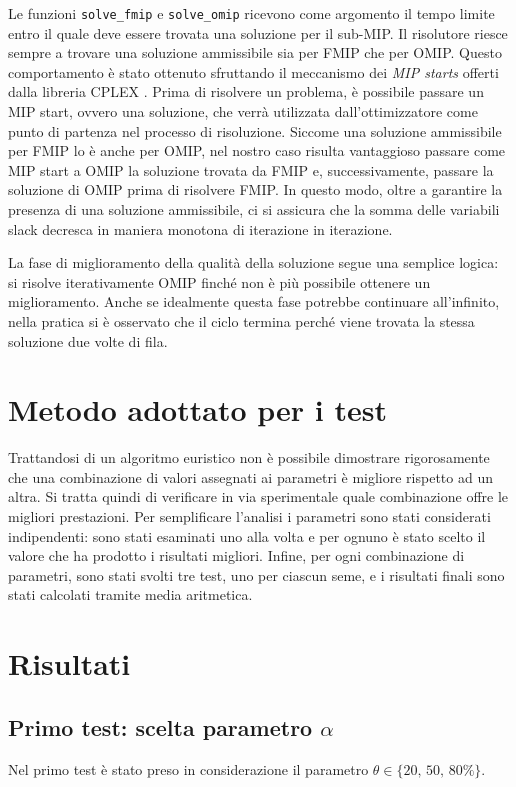 Le funzioni \verb|solve_fmip| e \verb|solve_omip| ricevono come argomento
il tempo limite entro il quale deve essere trovata una soluzione per il sub-MIP.
Il risolutore riesce sempre a trovare una soluzione ammissibile sia per FMIP
che per OMIP.
Questo comportamento è stato ottenuto sfruttando il meccanismo dei
\emph{MIP starts} offerti dalla libreria CPLEX \cite{cplexMipStarts}.
Prima di risolvere un problema, è possibile passare un MIP start, ovvero una 
soluzione, che verrà utilizzata dall'ottimizzatore come punto di partenza
nel processo di risoluzione.
Siccome una soluzione ammissibile per FMIP lo è anche per OMIP, nel
nostro caso risulta vantaggioso passare come MIP start a OMIP la soluzione
trovata da FMIP e, successivamente, passare la soluzione di OMIP
prima di risolvere FMIP.
In questo modo, oltre a garantire la presenza di una soluzione ammissibile,
ci si assicura che la somma delle variabili slack decresca in maniera 
monotona di iterazione in iterazione.

La fase di miglioramento della qualità della soluzione segue una
semplice logica: si risolve iterativamente OMIP finché non è più
possibile ottenere un miglioramento.
Anche se idealmente questa fase potrebbe continuare all'infinito, nella pratica
si è osservato che il ciclo termina perché viene trovata la stessa soluzione
due volte di fila.

\section{Metodo adottato per i test}%
\label{sub:Metodo seguito}
Trattandosi di un algoritmo euristico non è possibile dimostrare rigorosamente
che una combinazione di valori assegnati ai parametri è migliore rispetto ad
un altra.
Si tratta quindi di verificare in via sperimentale quale combinazione
offre le migliori prestazioni.
Per semplificare l'analisi i parametri sono stati considerati indipendenti:
sono stati esaminati uno alla volta e per ognuno è stato
scelto il valore che ha prodotto i risultati migliori.
Infine, per ogni combinazione di parametri, sono stati svolti tre test,
uno per ciascun seme, e i risultati finali sono stati calcolati tramite media
aritmetica.

\section{Risultati}%
\label{sub:I risultati}

\subsection{Primo test: scelta parametro \texorpdfstring{$\alpha$}{alpha}}%
\label{sub:Primo test: scelta parametro alpha}
Nel primo test è stato preso in considerazione il parametro $\theta\in\{20,\,50,\,80\%\}$.

